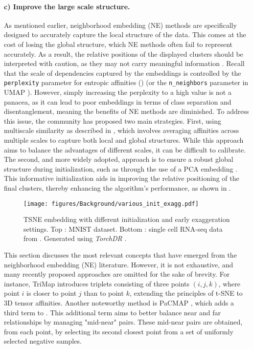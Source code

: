 \paragraph{c) Improve the large scale structure.} As mentioned earlier, neighborhood embedding (NE) methods are specifically designed to accurately capture the local structure of the data. This comes at the cost of losing the global structure, which NE methods often fail to represent accurately. As a result, the relative positions of the displayed clusters should be interpreted with caution, as they may not carry meaningful information \citep{kobak2019art}. Recall that the scale of dependencies captured by the embeddings is controlled by the \texttt{perplexity} parameter for entropic affinities () (or the \texttt{n\_neighbors} parameter in UMAP \citep{mcinnes2018umap}). However, simply increasing the perplexity to a high value is not a panacea, as it can lead to poor embeddings in terms of class separation and disentanglement, meaning the benefits of NE methods are diminished. To address this issue, the community has proposed two main strategies. First, using multiscale similarity as described in \citep{lee2015multi}, which involves averaging affinities across multiple scales to capture both local and global structures. While this approach aims to balance the advantages of different scales, it can be difficult to calibrate. The second, and more widely adopted, approach is to ensure a robust global structure during initialization, such as through the use of a PCA embedding \citep{wattenberg2016use}. This informative initialization aids in improving the relative positioning of the final clusters, thereby enhancing the algorithm's performance, as shown in .

\begin{figure}[t]
    \centering
    \texttt{[image: figures/Background/various\_init\_exagg.pdf]}
    \caption{TSNE embedding with different initialization and early exaggeration settings. Top : MNIST dataset. Bottom : single cell RNA-seq data from \citep{macosko2015highly}. Generated using \emph{TorchDR} \citep{vanassel2024torchdr}.
    }
    \label{fig:init_exagg}
\end{figure}

\begin{remark}
    This section discusses the most relevant concepts that have emerged from the neighborhood embedding (NE) literature. However, it is not exhaustive, and many recently proposed approaches are omitted for the sake of brevity. For instance, TriMap \citep{amid2019trimap} introduces triplets consisting of three points $ (i, j, k) $, where point $ i $ is closer to point $ j $ than to point $ k $, extending the principles of t-SNE to 3D tensor affinities. Another noteworthy method is PaCMAP \citep{wang2021understanding}, which adds a third term to . This additional term aims to better balance near and far relationships by managing "mid-near" pairs. These mid-near pairs are obtained, from each point, by selecting its second closest point from a set of uniformly selected negative samples.
\end{remark}

